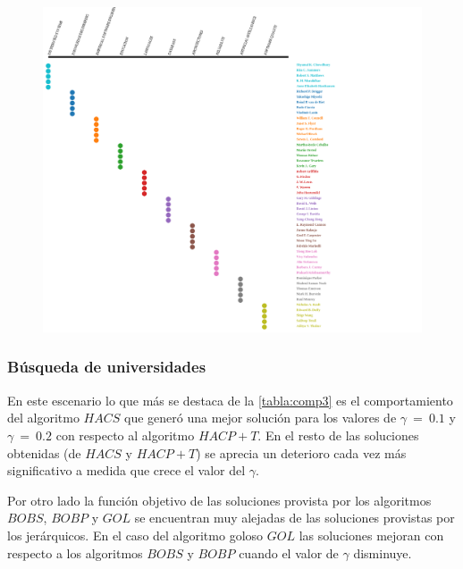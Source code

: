 \begin{figure}[H]
  \centering
    \includegraphics[width=1\textwidth]{img/aut-alg-6.png}
  \caption{}
  \label{res:aut-alg-6}
\end{figure}



\subsubsection{Búsqueda de universidades}
En este escenario lo que más se destaca de la \autoref{tabla:comp3} es el comportamiento del algoritmo $HACS$ que generó una mejor solución para los valores de $\gamma\ =\ 0.1$ y $\gamma\ =\ 0.2$ con respecto al algoritmo $HACP+T$. En el resto de las soluciones obtenidas (de $HACS$ y $HACP+T$) se aprecia un deterioro cada vez más significativo a medida que crece el valor del $\gamma$.

Por otro lado la función objetivo de las soluciones provista por los algoritmos $BOBS$, $BOBP$ y $GOL$ se encuentran muy alejadas de las soluciones provistas por los jerárquicos. En el caso del algoritmo goloso $GOL$ las soluciones mejoran con respecto a los algoritmos $BOBS$ y $BOBP$ cuando el valor de $\gamma$ disminuye.

